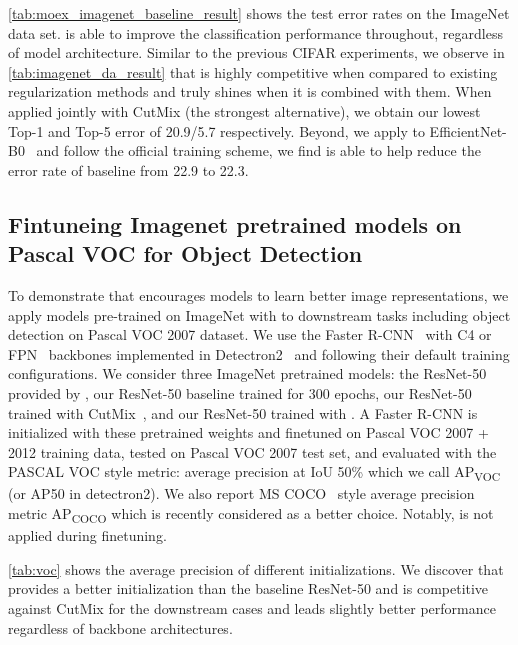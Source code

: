 \documentclass[final]{cvpr}
\begin{document}
\autoref{tab:moex_imagenet_baseline_result} shows the test error  rates on the ImageNet data set. 
\methodname{} is able to improve the classification performance throughout, regardless of model architecture. Similar to the previous CIFAR experiments, we observe in  \autoref{tab:imagenet_da_result} that \methodname{} is  highly competitive when compared to existing regularization methods and truly shines when it  is combined with them. When applied jointly with CutMix (the  strongest alternative), we obtain our lowest Top-1 and Top-5 error of 20.9/5.7  respectively. Beyond, we apply \methodname{} to   EfficientNet-B0~\cite{tan2019efficientnet} and follow the official training scheme, we find \methodname{} is able to help reduce the error rate of baseline from 22.9 to 22.3. 



\subsection{Fintuneing Imagenet pretrained models on Pascal VOC for Object Detection}
\label{object_dectection}
To demonstrate that \methodname{} encourages models to learn better image representations, we apply models pre-trained on ImageNet with \methodname{} to downstream tasks including object detection on Pascal VOC 2007 dataset.
We use the Faster R-CNN~\citep{ren2015faster} with C4 or FPN~\citep{lin2017feature} backbones implemented in Detectron2~\citep{wu2019detectron2} and following their default training configurations.
We consider three ImageNet pretrained models: the ResNet-50 provided by \citet{He2015}, our ResNet-50 baseline trained for 300 epochs, our ResNet-50 trained with CutMix~\citep{yun2019cutmix}, and our ResNet-50 trained with \methodname{}.
A Faster R-CNN is initialized with these pretrained weights and finetuned on Pascal VOC 2007 + 2012 training data, tested on Pascal VOC 2007 test set, and evaluated with the PASCAL VOC style metric: average precision at IoU 50\% which we call AP\textsubscript{VOC} (or AP50 in detectron2). We also report MS COCO~\citep{lin2014microsoft} style average precision metric AP\textsubscript{COCO} which is recently considered as a better choice.
Notably, \methodname{} is not applied during finetuning.

\autoref{tab:voc} shows the average precision of different initializations. We discover that \methodname{} provides a better initialization than the baseline ResNet-50 and is competitive against CutMix\citep{yun2019cutmix} for the downstream cases and leads slightly better performance regardless of backbone architectures. 
\end{document}
